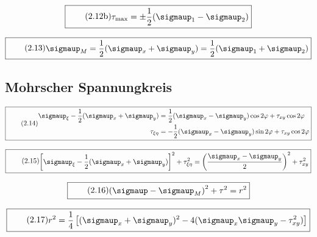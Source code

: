 \documentclass[11pt]{article}
\newcommand{\1}{ {\mathds{1}} }
\renewcommand{\sigma  }{\sigmaup   }
\begin{document}
		\begin{equation}
			\boxed{
				\tag{2.12b}
				\begin{split}
					\tau_{\text{max}}
					=
					\pm
					\frac{1}{2}(\sigma_1 -\sigma_2)
				\end{split}
			}
		\end{equation}

		\begin{equation}
			\boxed{
				\tag{2.13}
				\begin{split}
					\sigma_M
					=
					\frac{1}{2}(\sigma_x + \sigma_y)
					=
					\frac{1}{2}(\sigma_1 + \sigma_2)
				\end{split}
			}
		\end{equation}

		\subsection{Mohrscher Spannungkreis}

		\begin{equation}
			\boxed{
				\tag{2.14}
				\begin{split}
					\sigma_\xi-\frac{1}{2}(\sigma_x + \sigma_y)
					&=
					\frac{1}{2}(\sigma_x -\sigma_y)\cos 2\varphi + \tau_{xy}\cos 2 \varphi\\
					\tau_{\xi\eta}
					&=
					- \frac{1}{2}(\sigma_x - \sigma_y) \sin 2 \varphi + \tau_{xy} \cos 2\varphi
				\end{split}
			}
		\end{equation}		

		\begin{equation}
			\boxed{
				\tag{2.15}
				\begin{split}
					\left[\sigma_\xi - \frac{1}{2} (\sigma_x + \sigma_y)\right]^2
					+
					\tau_{\xi \eta}^2
					=
					\left(
						\frac{\sigma_x - \sigma_y}{2}
					\right)^2
					+
					\tau_{xy}^2
				\end{split}
			}
		\end{equation}		

		\begin{equation}
			\boxed{
				\tag{2.16}
				\begin{split}
					\left(\sigma - \sigma_M\right)^2
					+
					\tau^2
					=
					r^2
				\end{split}
			}
		\end{equation}		

		\begin{equation}
			\boxed{
				\tag{2.17}
				\begin{split}
					r^2
					=
					\frac{1}{4}
					\left[
						(\sigma_x + \sigma_y)^2
						-
						4 (\sigma_x\sigma_y -\tau_{xy}^2)
					\right]
				\end{split}
			}
		\end{equation}		
\end{document}
